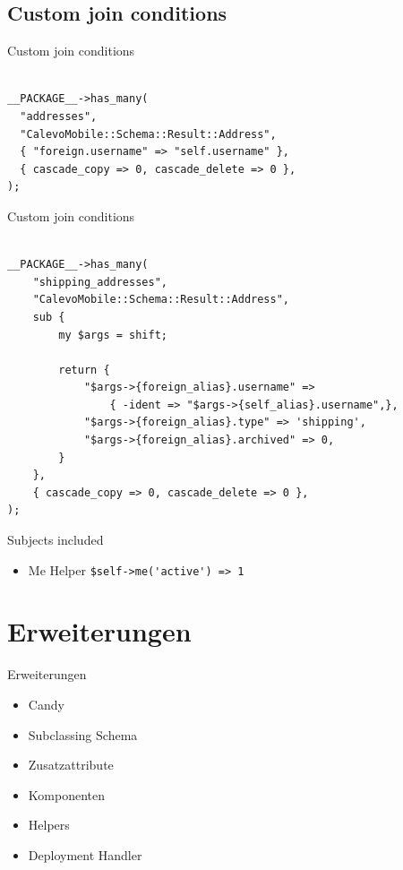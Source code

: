 \subsection{Custom join conditions}

\begin{frame}[fragile]{Custom join conditions}
\begin{lstlisting}

__PACKAGE__->has_many(
  "addresses",
  "CalevoMobile::Schema::Result::Address",
  { "foreign.username" => "self.username" },
  { cascade_copy => 0, cascade_delete => 0 },
);

\end{lstlisting}
\end{frame}

\begin{frame}[fragile]{Custom join conditions}
\begin{lstlisting}

__PACKAGE__->has_many(
    "shipping_addresses",
    "CalevoMobile::Schema::Result::Address",
    sub {
        my $args = shift;

        return {
            "$args->{foreign_alias}.username" =>
                { -ident => "$args->{self_alias}.username",},
            "$args->{foreign_alias}.type" => 'shipping',
            "$args->{foreign_alias}.archived" => 0,
        }
    },
    { cascade_copy => 0, cascade_delete => 0 },
);
\end{lstlisting}
\end{frame}

\begin{frame}[fragile]{Subjects included}
\begin{itemize}
\item Me Helper
\verb|$self->me('active') => 1|
\end{itemize}
\end{frame}

\section{Erweiterungen}

\begin{frame}{Erweiterungen}
\begin{itemize}
\item Candy
\item Subclassing Schema
\item Zusatzattribute
\item Komponenten
\item Helpers
\item Deployment Handler
\end{itemize}
\end{frame}

